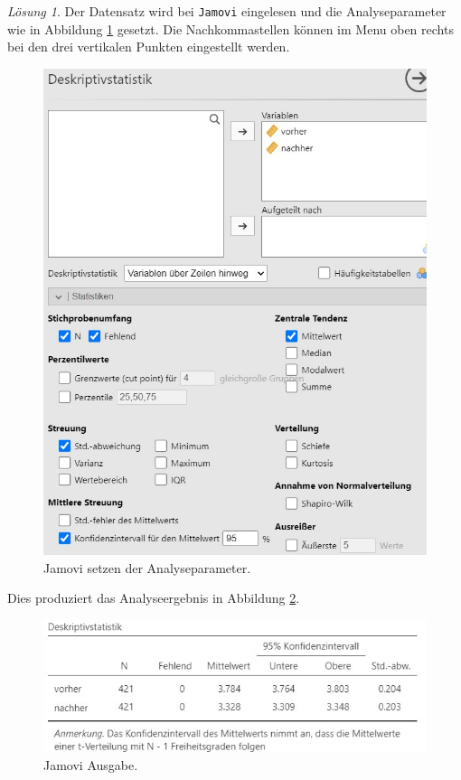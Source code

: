 \documentclass[
]{book}
\theoremstyle{definition}
\theoremstyle{definition}
\theoremstyle{definition}
\theoremstyle{definition}
\theoremstyle{remark}
\newtheorem*{solution}{Lösung}
\begin{document}
\begin{solution}

Der Datensatz wird bei \texttt{Jamovi} eingelesen und die Analyseparameter wie in Abbildung \ref{fig:sol-stranger-input} gesetzt. Die Nachkommastellen können im Menu oben rechts bei den drei vertikalen Punkten eingestellt werden.

\begin{figure}
\includegraphics[width=1\linewidth]{figures/04-exr-stranger-jmv-input} \caption{Jamovi setzen der Analyseparameter.}\label{fig:sol-stranger-input}
\end{figure}

Dies produziert das Analyseergebnis in Abbildung \ref{fig:sol-stranger-output}.

\begin{figure}
\includegraphics[width=1\linewidth]{figures/04-exr-stranger-jmv-output} \caption{Jamovi Ausgabe.}\label{fig:sol-stranger-output}
\end{figure}


\end{solution}
\end{document}
